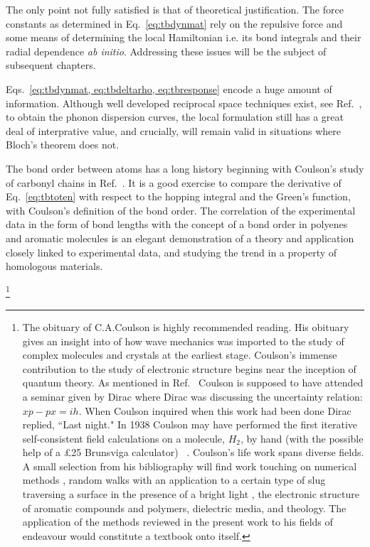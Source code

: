 The only point not fully satisfied is that of theoretical justification.
The force constants as determined in Eq.~\ref{eq:tbdynmat}
rely on the repulsive force and some means of determining 
the local Hamiltonian i.e. its bond integrals and their 
radial dependence {\it ab initio}. Addressing these issues
will be the subject of subsequent chapters. 
 
Eqs.~\ref{eq:tbdynmat, eq:tbdeltarho, eq:tbresponse} encode
a huge amount of information. Although well developed reciprocal space 
techniques exist, see Ref.~\cite{baroni01}, to obtain the phonon dispersion
curves, the local formulation still has a great deal of 
interprative value, and crucially, will remain valid
in situations where Bloch's theorem does not.

The bond order between atoms has a long history
beginning with Coulson's study of carbonyl 
chains in Ref.~\cite{coulson39,coulson47}. 
It is a good exercise to compare the derivative of Eq.~\ref{eq:tbtoten} with respect
to the hopping integral and the Green's function,
with Coulson's definition of the bond order\cite{coulson39}. 
The correlation of the experimental data in the form of bond lengths
with the concept of a bond order in polyenes and aromatic molecules
is an elegant demonstration of a theory and application closely
linked to experimental data, and studying the trend in a property
of homologous materials.

\footnote{The obituary of C.A.Coulson\cite{altmann74} 
is highly recommended reading. His obituary gives an insight into 
of how wave mechanics was imported to the study of 
complex molecules and crystals at the earliest stage. Coulson's 
immense contribution to the study of electronic structure
begins near the inception of quantum theory. As mentioned in Ref.~\cite{altmann74}
Coulson is supposed to have attended a seminar given by Dirac 
where Dirac was discussing the uncertainty relation: $xp-px=ih$.
When Coulson inquired when this work had been done Dirac replied, 
``Last night." In 1938 Coulson may have performed the first 
iterative self-consistent field calculations 
on a molecule, $H_2$, by hand (with the possible help of a £25 Brunsviga calculator)
~\cite{coulson38}. Coulson's life work spans diverse fields.
A small selection from his bibliography will find work 
touching on numerical methods \cite{coulson37,coulson42}, 
random walks with an application to a certain type of slug 
traversing a surface in the presence of a bright light \cite{coulson47}, 
the electronic structure of aromatic compounds and polymers, 
dielectric media, and theology. The application of the methods 
reviewed in the present work to his fields of endeavour would 
constitute a textbook onto itself.}

